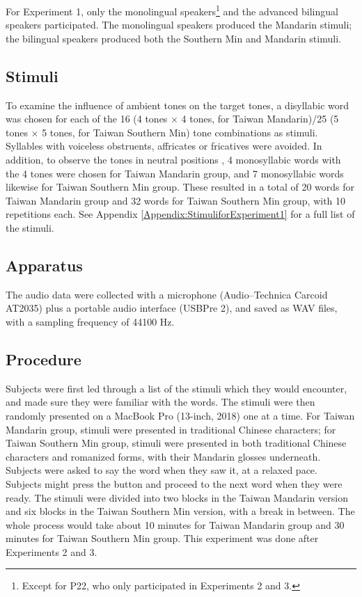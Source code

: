 \documentclass[12pt]{report}
\begin{document}
\begin{CJK}{UTF8}{bsmi}
For Experiment 1, only the monolingual speakers\footnote{Except for P22, who only participated in Experiments 2 and 3.} and the advanced bilingual speakers participated. The monolingual speakers produced the Mandarin stimuli; the bilingual speakers produced both the Southern Min and Mandarin stimuli.

\subsection{Stimuli}
To examine the influence of ambient tones on the target tones, a disyllabic word was chosen for each of the 16 (4 tones × 4 tones, for Taiwan Mandarin)/25 (5 tones × 5 tones\footnotemark, for Taiwan Southern Min) tone combinations as stimuli. Syllables with voiceless obstruents, affricates or fricatives were avoided. In addition, to observe the tones in neutral positions , 4 monosyllabic words with the 4 tones were chosen for Taiwan Mandarin group, and 7 monosyllabic words likewise for Taiwan Southern Min group. These resulted in a total of 20 words for Taiwan Mandarin group and 32 words for Taiwan Southern Min group, with 10 repetitions each. See Appendix \ref{Appendix:StimuliforExperiment1} for a full list of the stimuli.


\subsection{Apparatus}
The audio data were collected with a microphone (Audio–Technica Carcoid AT2035) plus a portable audio interface (USBPre 2), and saved as WAV files, with a sampling frequency of 44100 Hz.

\subsection{Procedure}
Subjects were first led through a list of the stimuli which they would encounter, and made sure they were familiar with the words. The stimuli were then randomly presented on a MacBook Pro (13-inch, 2018) one at a time. For Taiwan Mandarin group, stimuli were presented in traditional Chinese characters; for Taiwan Southern Min group, stimuli were presented in both traditional Chinese characters and romanized forms, with their Mandarin glosses underneath. Subjects were asked to say the word when they saw it, at a relaxed pace. Subjects might press the button and proceed to the next word when they were ready. The stimuli were divided into two blocks in the Taiwan Mandarin version and six blocks in the Taiwan Southern Min version, with a break in between. The whole process would take about 10 minutes for Taiwan Mandarin group and 30 minutes for Taiwan Southern Min group. This experiment was done after Experiments 2 and 3.


\end{CJK}
\end{document}
